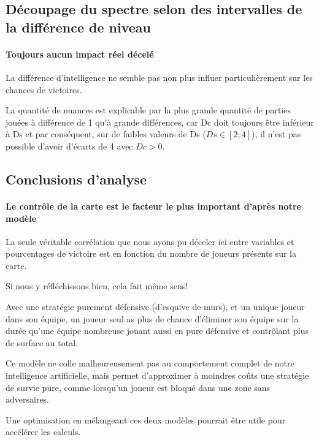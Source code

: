 \subsection{Découpage du spectre selon des intervalles de la différence de niveau}
\paragraph{Toujours aucun impact réel décelé}
La différence d'intelligence ne semble pas non plus influer particulièrement sur les chances de victoires.

\begin{info}
	La quantité de nuances est explicable par la plus grande quantité de parties jouées à différence de 1 qu'à grande différences, car Dc doit toujours être inférieur à Ds et par conséquent, sur de faibles valeurs de Ds ($Ds \in [2;4]$), il n'est pas possible d'avoir d'écarts de 4 avec $Dc > 0$.
\end{info}


\subsection{Conclusions d'analyse}
\paragraph{Le contrôle de la carte est le facteur le plus important d'après notre modèle}
La seule véritable corrélation que nous ayons pu déceler ici entre variables et pourcentages de victoire est en fonction du nombre de joueurs présents sur la carte.

Si nous y réfléchissons bien, cela fait même sens! 

\begin{result}
	Avec une stratégie purement défensive (d'esquive de murs), et un unique joueur dans son équipe, un joueur seul as plus de chance d'éliminer son équipe sur la durée qu'une équipe nombreuse jouant aussi en pure défensive et contrôlant plus de surface au total.
\end{result}


\begin{info}
	Ce modèle ne colle malheureusement pas au comportement complet de notre intelligence artificielle, mais permet d'approximer à moindres coûts une stratégie de survie pure, comme lorsqu'un joueur est bloqué dans une zone sans adversaires.
	
	Une optimisation en mélangeant ces deux modèles pourrait être utile pour accélérer les calculs. 
\end{info}